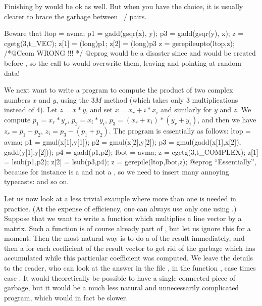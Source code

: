 \noindent Finishing by  would be ok as well.
But when you have the choice, it is usually clearer to brace the garbage
between ~/  pairs.

\noindent Beware that
\bprog
  ltop = avma; p1 = gadd(gsqr(x), y); p3 = gadd(gsqr(y), x);
  z = cgetg(3,t_VEC);
  z[1] = (long)p1;
  z[2] = (long)p3
  z = gerepileupto(ltop,z); /*@Ccom WRONG !!! */
@eprog
\noindent would be a disaster since  and  would be created
before , so the call to  would overwrite them,
leaving  and  pointing at random data!

We next want to write a program to compute the product of two complex numbers
$x$ and $y$, using the $3M$ method (which takes only 3 multiplications
instead of 4). Let $z = x*y$, and set $x = x_r + i*x_i$ and similarly for $y$
and $z$. We compute $p_1 = x_r*y_r$, $p_2=x_i*y_i$,
$p_3=(x_r+x_i)*(y_r+y_i)$, and then we have $z_r=p_1-p_2$,
$z_i=p_3-(p_1+p_2)$. The program is essentially as follows:
%
\bprog
ltop = avma;
p1 = gmul(x[1],y[1]);
p2 = gmul(x[2],y[2]);
p3 = gmul(gadd(x[1],x[2]), gadd(y[1],y[2]));
p4 = gadd(p1,p2); lbot = avma;
z = cgetg(3,t_COMPLEX);
z[1] = lsub(p1,p2);
z[2] = lsub(p3,p4);
z = gerepile(ltop,lbot,z);
@eprog
\noindent
``Essentially'', because for instance  is a  and not a
, so we need to insert many annoying typecasts:
 and so on.

Let us now look at a less trivial example where more than one 
is needed in practice. (At the expense of efficiency, one can always use only
one using .) Suppose that we want to write a function
which multiplies a line vector by a matrix. Such a function is of course
already part of , but let us ignore this for a moment. Then the
most natural way is to do a  of the result immediately, and then a
 for each coefficient of the result vector to get rid of the
garbage which has accumulated while this particular coefficient was computed.
We leave the details to the reader, who can look at the answer in the file
, in the function , case  times case
. It would theoretically be possible to have a single connected
piece of garbage, but it would be a much less natural and unnecessarily
complicated program, which would in fact be slower.


